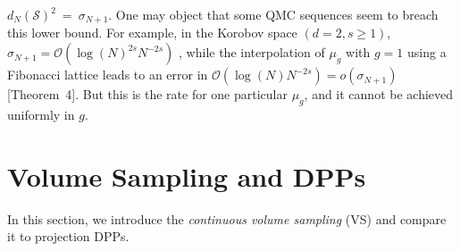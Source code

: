 \documentclass[twoside,11pt]{book}
\numberwithin{theorem}{chapter}
\numberwithin{definition}{chapter}
\numberwithin{proposition}{chapter}
\numberwithin{corollary}{chapter}
\numberwithin{example}{chapter}
\numberwithin{lemma}{chapter}
\numberwithin{assumption}{chapter}
\numberwithin{equation}{chapter}
\numberwithin{figure}{chapter}
\DeclareMathOperator{\F}{\mathcal{F}}
\def\Ltwo{\mathbb{L}_{2}(\mathrm{d} \omega)}
\newcommand{\pc}[1]{\textcolor{blue}{#1}}
\newcommand{\rb}[1]{\textcolor{magenta}{#1}}
\begin{document}
$d_{N}(\mathcal{S})^{2}~=~\sigma_{N+1}$.
One may object that some QMC sequences seem to breach this lower bound. For example, in the Korobov space $(d = 2, s \geq 1)$, $\sigma_{N+1} = \mathcal{O}(\log(N)^{2s} N^{-2s})$ \parencite{Bac17}, while the interpolation of $\mu_{g}$ with $g = 1$ using a Fibonacci lattice leads to an error in $\mathcal{O}(\log (N) N^{-2s}) = o(\sigma_{N+1})$ \parencite{BiTeYu12}[Theorem~4]. But this is the rate for one particular $\mu_{g}$, and it cannot be achieved uniformly in $g$.


\section{Volume Sampling and DPPs}\label{CVS_sec:VS_DPP}
In this section, we introduce the \emph{continuous volume sampling} (VS) and compare it to projection DPPs. 
\end{document}
